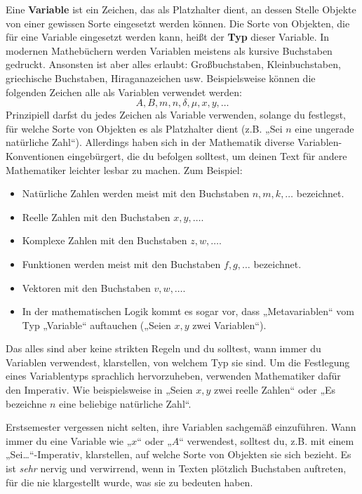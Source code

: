 \begin{de}[Variable] \label{variable}
 Eine \textbf{Variable} ist ein Zeichen, das als Platzhalter dient, an dessen Stelle Objekte von einer gewissen Sorte eingesetzt werden können. Die Sorte von Objekten, die für eine Variable eingesetzt werden kann, heißt der \textbf{Typ} dieser Variable. In modernen Mathebüchern werden Variablen meistens als kursive Buchstaben gedruckt. Ansonsten ist aber alles erlaubt: Großbuchstaben, Kleinbuchstaben, griechische Buchstaben, Hiraganazeichen usw. Beispielsweise können die folgenden Zeichen alle als Variablen verwendet werden:
 \[ A,B,m,n,\delta,\mu, x,y,\dots \]
 Prinzipiell darfst du jedes Zeichen als Variable verwenden, solange du festlegst, für welche Sorte von Objekten es als Platzhalter dient (z.B. „Sei $n$ eine ungerade natürliche Zahl“). Allerdings haben sich in der Mathematik diverse Variablen-Konventionen eingebürgert, die du befolgen solltest, um deinen Text für andere Mathematiker leichter lesbar zu machen. Zum Beispiel:
 \begin{itemize}
  \item Natürliche Zahlen werden meist mit den Buchstaben $n,m,k,\dots$ bezeichnet.
  \item Reelle Zahlen mit den Buchstaben $x,y,\dots$.
    \item Komplexe Zahlen mit den Buchstaben $z,w,\dots$.
  \item Funktionen werden meist mit den Buchstaben $f,g,\dots$ bezeichnet.
  \item Vektoren mit den Buchstaben $v,w,\dots$.
  \item In der mathematischen Logik kommt es sogar vor, dass „Metavariablen“ vom Typ „Variable“ auftauchen („Seien $x,y$ zwei Variablen“).
 \end{itemize}
 Das alles sind aber keine strikten Regeln und du solltest, wann immer du Variablen verwendest, klarstellen, von welchem Typ sie sind. Um die Festlegung eines Variablentyps sprachlich hervorzuheben, verwenden Mathematiker dafür den Imperativ. Wie beispielsweise in „Seien $x,y$ zwei reelle Zahlen“ oder „Es bezeichne $n$ eine beliebige natürliche Zahl“.
\end{de}



\begin{bem}
Erstsemester vergessen nicht selten, ihre Variablen sachgemäß einzuführen. Wann immer du eine Variable wie „$x$“ oder „$A$“ verwendest, solltest du, z.B. mit einem „Sei\dots“-Imperativ, klarstellen, auf welche Sorte von Objekten sie sich bezieht. Es ist \emph{sehr} nervig und verwirrend, wenn in Texten plötzlich Buchstaben auftreten, für die nie klargestellt wurde, was sie zu bedeuten haben. 
\end{bem}






